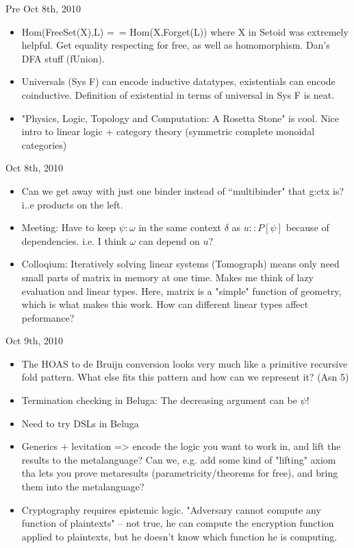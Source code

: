 \documentclass{article}
\begin{document}
Pre Oct 8th, 2010
\begin{itemize}
\item Hom(FreeSet(X),L) =~= Hom(X,Forget(L)) where X in Setoid was extremely helpful. Get equality respecting for free, as well as homomorphism. Dan's DFA stuff (fUnion).
\item Universals (Sys F) can encode inductive datatypes, existentials can encode coinductive. Definition of existential in terms of universal in Sys F is neat.
\item "Physics, Logic, Topology and Computation: A Rosetta Stone" is cool. Nice intro to linear logic + category theory (symmetric complete monoidal categories)
\end{itemize}
Oct 8th, 2010
\begin{itemize}
\item Can we get away with just one binder instead of ``multibinder" that g:ctx is? i..e products on the left.
\item Meeting: Have to keep $\psi : \omega$ in the same context $\delta$ as $u::P[\psi]$ because of dependencies. i.e. I think $\omega$ can depend on $u$?
\item Colloqium: Iteratively solving linear systems (Tomograph) means only need small parts of matrix in memory at one time. Makes me think of lazy evaluation and linear types. Here, matrix is a "simple" function of geometry, which is what makes this work. How can different linear types affect peformance?
\end{itemize}
Oct 9th, 2010
\begin{itemize}
\item The HOAS to de Bruijn conversion looks very much like a primitive recursive fold pattern. What else fits this pattern and how can we represent it? (Asn 5)
\item Termination checking in Beluga: The decreasing argument can be $\psi$!
\item Need to try DSLs in Beluga
\item Generics + levitation => encode the logic you want to work in, and lift the results to the metalanguage? Can we, e.g. add some kind of "lifting" axiom tha lets you prove metaresults (parametricity/theorems for free), and bring them into the metalanguage?
\item Cryptography requires epistemic logic. "Adversary cannot compute any function of plaintexts" -- not true, he can compute the encryption function applied to plaintexts, but he doesn't know which function he is computing.

\end{itemize}
\end{document}
